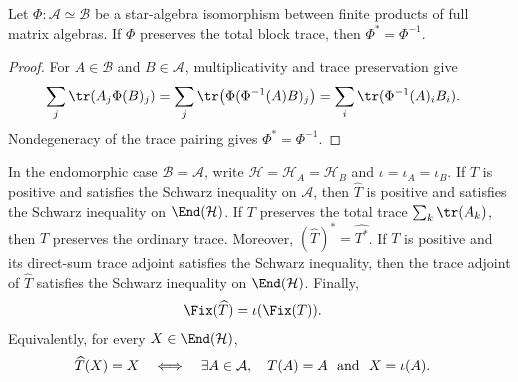 \begin{lemma}
    \label{lem:direct_sum_trace_adjoint_star_equiv_inverse}
    \leanok
    Let $\Phi:\mathcal A\simeq\mathcal B$ be a star-algebra isomorphism
    between finite products of full matrix algebras. If $\Phi$ preserves the
    total block trace, then $\Phi^*=\Phi^{-1}$.
\end{lemma}

\begin{proof}
    \leanok
    For $A\in\mathcal B$ and $B\in\mathcal A$, multiplicativity and trace
    preservation give
    \begin{align}
        \sum_j\tr(A_j\Phi(B)_j)
        &=\sum_j\tr\!\left(\Phi(\Phi^{-1}(A)B)_j\right)
          =\sum_i\tr(\Phi^{-1}(A)_iB_i).
        \notag
    \end{align}
    Nondegeneracy of the trace pairing gives $\Phi^*=\Phi^{-1}$.
\end{proof}

\begin{theorem}%
    \label{thm:direct_sum_full_matrix_extension_compatibility}
    \leanok
    In the endomorphic case $\mathcal B=\mathcal A$, write
    $\mathcal H=\mathcal H_A=\mathcal H_B$ and
    $\iota=\iota_A=\iota_B$. If $T$ is positive and satisfies the Schwarz
    inequality on $\mathcal A$, then $\widehat T$ is positive and satisfies
    the Schwarz inequality on $\End(\mathcal H)$. If $T$ preserves the
    total trace $\sum_k\tr(A_k)$, then $\widehat T$ preserves the ordinary
    trace. Moreover, $(\widehat T)^*=\widehat{T^*}$. If $T$ is positive and
    its direct-sum trace adjoint satisfies the Schwarz inequality, then the
    trace adjoint of $\widehat T$ satisfies the Schwarz inequality on
    $\End(\mathcal H)$. Finally,
    \begin{align}
        \Fix(\widehat T)
        &=\iota(\Fix(T)).
        \label{eq:spectral_extension_fixed_points}
    \end{align}
    Equivalently, for every $X\in\End(\mathcal H)$,
    \begin{align}
        \widehat T(X)=X
        &\quad\Longleftrightarrow\quad
        \exists A\in\mathcal A,\quad
        T(A)=A\ \text{ and }\ X=\iota(A).
        \notag
    \end{align}
\end{theorem}

